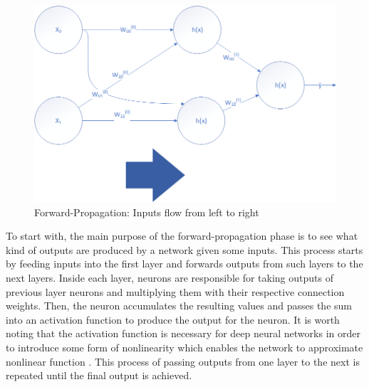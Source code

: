 \documentclass[conference]{IEEEtran}
\begin{document}
        \begin{figure}[!htb]
            \centering
            \captionsetup{justification=centering}
            \includegraphics[width=\linewidth]{ForwardProp.png}
            \caption{Forward-Propagation: Inputs flow from left to right}  
        \end{figure}

        To start with, the main purpose of the forward-propagation phase is to see what kind of outputs are produced by a network given some inputs. This process starts by feeding inputs into the first layer and forwards outputs from such layers to the next layers. Inside each layer, neurons are responsible for taking outputs of previous layer neurons and multiplying them with their respective connection weights. Then, the neuron accumulates the resulting values and passes the sum into an activation function to produce the output for the neuron. It is worth noting that the activation function is necessary for deep neural networks in order to introduce some form of nonlinearity which enables the network to approximate nonlinear function \cite{luhaniwal_2020}. This process of passing outputs from one layer to the next is repeated until the final output is achieved.
\end{document}
